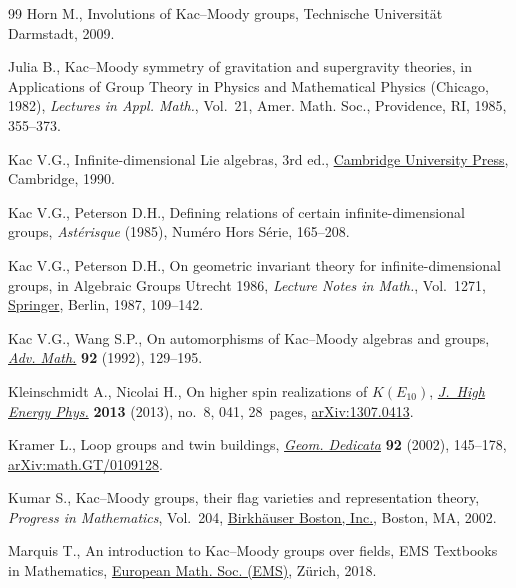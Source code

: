 \documentclass[11pt]{article}
\numberwithin{equation}{section}
\numberwithin{equation}{section}
\begin{document}
\begin{thebibliography}{99}
Horn M., Involutions of {K}ac--{M}oody groups, {T}echnische {U}niversit\"at
 {D}armstadt, 2009.

Julia B., Kac--{M}oody symmetry of gravitation and supergravity theories, in
 Applications of Group Theory in Physics and Mathematical Physics ({C}hicago,
 1982), \textit{Lectures in Appl. Math.}, Vol.~21, Amer. Math. Soc.,
 Providence, RI, 1985, 355--373.

Kac V.G., Infinite-dimensional {L}ie algebras, 3rd ed., \href{https://doi.org/10.1017/CBO9780511626234}{Cambridge University
 Press}, Cambridge, 1990.

Kac V.G., Peterson D.H., Defining relations of certain infinite-dimensional
 groups, \textit{Ast\'erisque} (1985), Num\'ero Hors S\'erie, 165--208.

Kac V.G., Peterson D.H., On geometric invariant theory for infinite-dimensional
 groups, in Algebraic Groups {U}trecht 1986, \textit{Lecture Notes in Math.},
 Vol.~1271, \href{https://doi.org/10.1007/BFb0079235}{Springer}, Berlin, 1987, 109--142.

Kac V.G., Wang S.P., On automorphisms of {K}ac--{M}oody algebras and groups,
 \href{https://doi.org/10.1016/0001-8708(92)90063-Q}{\textit{Adv. Math.}} \textbf{92} (1992), 129--195.

Kleinschmidt A., Nicolai H., On higher spin realizations of {$K(E_{10})$},
 \href{https://doi.org/10.1007/JHEP08(2013)041}{\textit{J.~High Energy Phys.}} \textbf{2013} (2013), no.~8, 041, 28~pages, \href{https://arxiv.org/abs/1307.0413}{arXiv:1307.0413}.

Kramer L., Loop groups and twin buildings, \href{https://doi.org/10.1023/A:1019603827308}{\textit{Geom. Dedicata}} \textbf{92}
 (2002), 145--178, \href{https://arxiv.org/abs/math.GT/0109128}{arXiv:math.GT/0109128}.

Kumar S., Kac--{M}oody groups, their flag varieties and representation theory,
 \textit{Progress in Mathematics}, Vol.~204, \href{https://doi.org/10.1007/978-1-4612-0105-2}{Birkh\"auser Boston, Inc.},
 Boston, MA, 2002.

Marquis T., An introduction to {K}ac--{M}oody groups over fields, EMS Textbooks
 in Mathematics, \href{https://doi.org/10.4171/187}{European Math. Soc. (EMS)}, Z\"urich, 2018.


\end{thebibliography}
\end{document}
